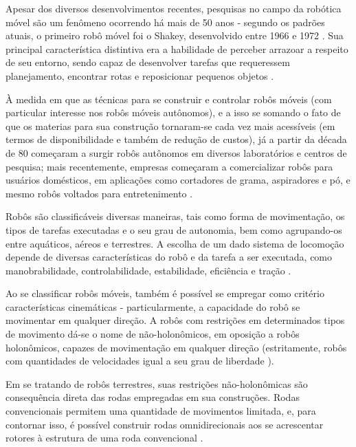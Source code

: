 

Apesar dos diversos desenvolvimentos recentes, pesquisas no campo da robótica móvel são um fenômeno ocorrendo há mais de 50 anos - segundo os padrões atuais, 
o primeiro robô móvel foi o Shakey, desenvolvido entre 1966 e 1972 \cite{TAKAHASHI}. 
Sua principal característica distintiva era a habilidade de perceber arrazoar a respeito de seu entorno, 
sendo capaz de desenvolver tarefas que requeressem planejamento, encontrar rotas e reposicionar pequenos objetos \cite{sri_international}.

À medida em que as técnicas para se construir e controlar robôs móveis (com particular interesse nos robôs móveis autônomos), 
e a isso se somando o fato de que os materias para sua construção tornaram-se cada vez mais acessíveis (em termos de disponibilidade 
e também de redução de custos), já a partir da década de 80 começaram a surgir robôs autônomos em diversos laboratórios e centros de pesquisa;
 mais recentemente, empresas começaram a comercializar robôs para usuários domésticos, em aplicações como cortadores de grama, aspiradores e pó, 
 e mesmo robôs voltados para entretenimento \cite{TAKAHASHI}.

Robôs são classificáveis diversas maneiras, tais como forma de movimentação, os tipos de tarefas executadas e o seu grau de autonomia, 
bem como agrupando-os entre aquáticos, aéreos e terrestres. A escolha de um dado sistema de locomoção depende de diversas características do robô e 
da tarefa a ser executada, como manobrabilidade, controlabilidade, estabilidade, eficiência e tração \cite{TAKAHASHI}.

Ao se classificar robôs móveis, também é possível se empregar como critério características cinemáticas - particularmente, 
a capacidade do robô se movimentar em qualquer direção. A robôs com restrições em determinados tipos de movimento dá-se o nome de não-holonômicos, 
em oposição a robôs holonômicos, capazes de movimentação em qualquer direção (estritamente, robôs com quantidades de velocidades igual a seu grau de liberdade \cite{TAKAHASHI}).

Em se tratando de robôs terrestres, suas restrições não-holonômicas são consequência direta das rodas empregadas em sua construções. 
Rodas convencionais permitem uma quantidade de movimentos limitada, e, para contornar isso, é possível construir rodas omnidirecionais aos se acrescentar rotores à estrutura de uma roda convencional \cite{TAKAHASHI}.
